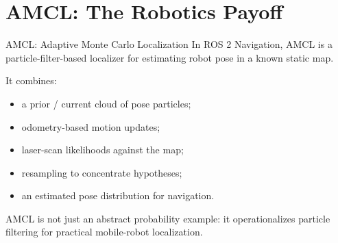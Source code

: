 \documentclass[aspectratio=169,10pt]{beamer}
\begin{document}
\section{AMCL: The Robotics Payoff}

\begin{frame}[shrink=10]{AMCL: Adaptive Monte Carlo Localization}
  In ROS 2 Navigation, AMCL is a particle-filter-based localizer for estimating robot pose in a known static map.

  It combines:
  \begin{itemize}
    \item a prior / current cloud of pose particles;
    \item odometry-based motion updates;
    \item laser-scan likelihoods against the map;
    \item resampling to concentrate hypotheses;
    \item an estimated pose distribution for navigation.
  \end{itemize}

  \begin{keyidea}
    AMCL is not just an abstract probability example: it operationalizes particle filtering for practical mobile-robot localization.
  \end{keyidea}
\end{frame}
\end{document}
